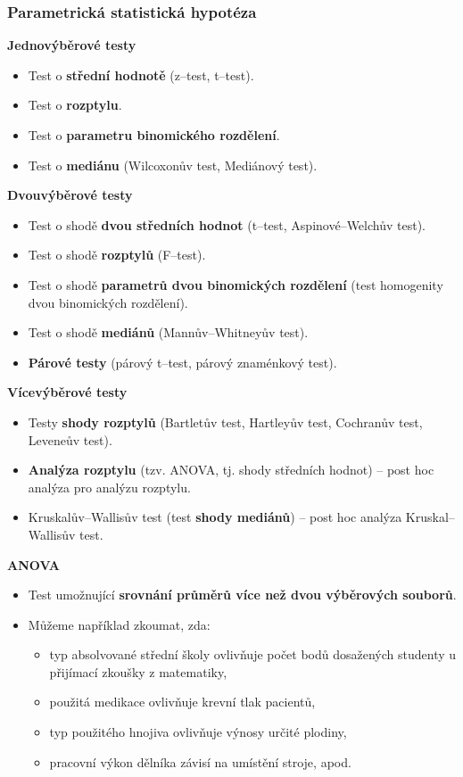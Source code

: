 \subsubsection{Parametrická statistická hypotéza}
\textbf{Jednovýběrové testy}
\begin{itemize}
	\item Test o \textbf{střední hodnotě} (z--test, t--test).
	\item Test o \textbf{rozptylu}.
	\item Test o \textbf{parametru binomického rozdělení}.
	\item Test o \textbf{mediánu} (Wilcoxonův test, Mediánový test).
\end{itemize}
\textbf{Dvouvýběrové testy}
\begin{itemize}
	\item Test o shodě \textbf{dvou středních hodnot} (t--test, Aspinové--Welchův test).
	\item Test o shodě \textbf{rozptylů} (F--test).
	\item Test o shodě \textbf{parametrů dvou binomických rozdělení} (test homogenity dvou binomických rozdělení).
	\item Test o shodě \textbf{mediánů} (Mannův--Whitneyův test).
	\item \textbf{Párové testy} (párový t--test, párový znaménkový test).
\end{itemize}
\textbf{Vícevýběrové testy}
\begin{itemize}
	\item Testy \textbf{shody rozptylů} (Bartletův test, Hartleyův test, Cochranův test, Leveneův test).
	\item \textbf{Analýza rozptylu} (tzv. ANOVA, tj. shody středních hodnot) -- post hoc analýza pro analýzu rozptylu.
	\item Kruskalův--Wallisův test (test \textbf{shody mediánů}) -- post hoc analýza Kruskal--Wallisův test.
\end{itemize}
\textbf{ANOVA}
\begin{itemize}
	\item Test umožnující \textbf{srovnání průměrů více než dvou výběrových souborů}.
	\item Můžeme například zkoumat, zda:
	\begin{itemize}
		\item typ absolvované střední školy ovlivňuje počet bodů dosažených studenty u přijímací zkoušky z matematiky,
		\item použitá medikace ovlivňuje krevní tlak pacientů,
		\item typ použitého hnojiva ovlivňuje výnosy určité plodiny,
		\item pracovní výkon dělníka závisí na umístění stroje, apod.
	\end{itemize}
\end{itemize}